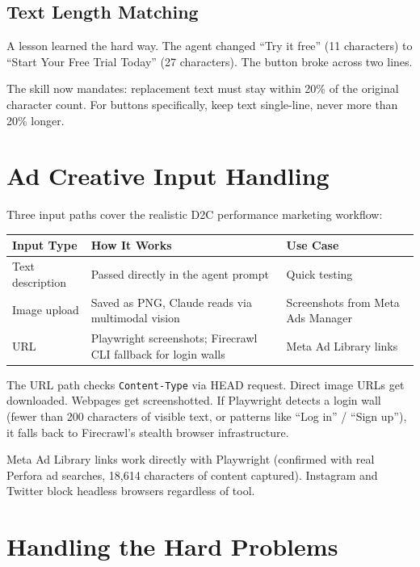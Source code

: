\documentclass{article}
\begin{document}
\subsection{Text Length Matching}

A lesson learned the hard way. The agent changed ``Try it free'' (11 characters) to ``Start Your Free Trial Today'' (27 characters). The button broke across two lines.

The skill now mandates: replacement text must stay within 20\% of the original character count. For buttons specifically, keep text single-line, never more than 20\% longer.

\section{Ad Creative Input Handling}

Three input paths cover the realistic D2C performance marketing workflow:

\begin{center}
\begin{tabularx}{\textwidth}{lXl}
\toprule
\textbf{Input Type} & \textbf{How It Works} & \textbf{Use Case} \\
\midrule
Text description & Passed directly in the agent prompt & Quick testing \\
Image upload & Saved as PNG, Claude reads via multimodal vision & Screenshots from Meta Ads Manager \\
URL & Playwright screenshots; Firecrawl CLI fallback for login walls & Meta Ad Library links \\
\bottomrule
\end{tabularx}
\end{center}

The URL path checks \texttt{Content-Type} via HEAD request. Direct image URLs get downloaded. Webpages get screenshotted. If Playwright detects a login wall (fewer than 200 characters of visible text, or patterns like ``Log in'' / ``Sign up''), it falls back to Firecrawl's stealth browser infrastructure.

Meta Ad Library links work directly with Playwright (confirmed with real Perfora ad searches, 18,614 characters of content captured). Instagram and Twitter block headless browsers regardless of tool.

\section{Handling the Hard Problems}
\end{document}
